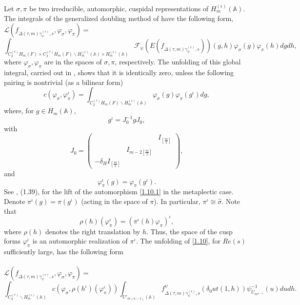 \documentclass[12pts]{amsart}
\newcommand{\BA}{{\mathbb {A}}}
\begin{document}
Let $\sigma,  \pi$ be two irreducible, automorphic, cuspidal representations
of $H^{(\epsilon)}_m(\BA)$. The integrals of the generalized doubling method of \cite{CFGK17} have the following form,\\
$\mathcal{L}(f_{\Delta(\tau,m)\gamma^{(\epsilon)}_\psi,s},\varphi_\sigma, \varphi_\pi)=$
\begin{equation}\label{1.10}
\int_{C_2^{(\epsilon)}H_m(F)\times C_2^{(\epsilon)}H_m(F)\backslash
	H^{(\epsilon)}_m(\BA)\times H^{(\epsilon)}_m(\BA)}\mathcal{F}_\psi(E(f_{\Delta(\tau,
	m)\gamma^{(\epsilon)}_\psi,s}))(g,h)\varphi_\sigma(g)\varphi_\pi(h)dgdh,
\end{equation}
where $\varphi_\sigma, \varphi_\pi $ are in the spaces of $\sigma, \pi$, respectively. 
The unfolding of this global integral, carried out in \cite{CFGK17}, shows that it is identically zero, unless the following pairing is nontrivial (as a bilinear form)
\begin{equation}\label{1.10.0}
c(\varphi_\sigma,\varphi_\pi^\iota)=\int_{C_2^{(\epsilon)}H_m(F)\backslash
	H^{(\epsilon)}_m(\BA)}\varphi_\sigma(g)\varphi_\pi(g^\iota)dg,
\end{equation}
where, for $g\in H_m(\BA)$,
\begin{equation}\label{1.10.1}
g^\iota=J_0^{-1}gJ_0,
\end{equation} 
with
$$
J_0=\begin{pmatrix}&&I_{[\frac{m}{2}]}\\&I_{m-2[\frac{m}{2}]}\\-\delta_HI_{[\frac{m}{2}]}\end{pmatrix},
$$
and 
$$
\varphi_\pi^\iota(g)=\varphi_\pi(g^\iota).
$$
See \cite{GS18}, (1.39), for the lift of the automorphism \eqref{1.10.1} in the metaplectic case. Denote $\pi^\iota (g)=\pi(g^\iota)$ (acting in the space of $\pi$). In particular, $\pi^\iota\cong \hat{\sigma}$. Note that
\begin{equation}\label{1.10.2}
\rho(h)(\varphi_\pi^\iota)=(\pi^\iota(h)\varphi_\pi)^\iota,
\end{equation}
where $\rho(h)$ denotes the right translation by $h$. Thus, the space of the cusp forms $\varphi_\pi^\iota$ is an automorphic realization of $\pi^\iota$. The unfolding of \eqref{1.10}, for $Re(s)$ sufficiently large, has the following form\\
\\
$\mathcal{L}(f_{\Delta(\tau,m)\gamma^{(\epsilon)}_\psi,s},\varphi_\sigma, \varphi_\pi)=$
\begin{equation}\label{1.10.3}
\int_{C_2^{(\epsilon)}\backslash H^{(\epsilon)}_m(\BA)}c(\varphi_\sigma,\rho(h^\iota)(\varphi_\pi^\iota))\int_{U'_{m(n-1)}(\BA)}
f^\psi_{\Delta(\tau, m)\gamma^{(\epsilon)}_\psi,s}(\delta_0ut(1,h))\psi^{-1}_{U_{m^{n-1}}}(u)dudh.
\end{equation}
\end{document}
